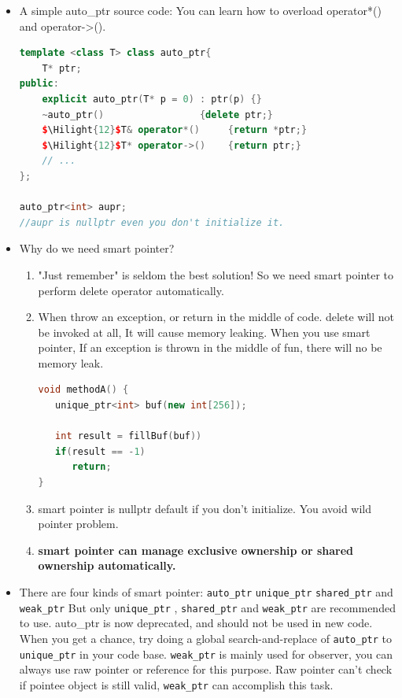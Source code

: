\documentclass[a4paper,12pt,twoside]{book}
\newcommand{\Hilight}[1]{\makebox[0pt][l]{\color{yellow}\rule[-3pt]{#1em}{11pt}}}
\begin{document}
\begin{itemize}
\item A simple auto\_ptr source code: You can learn how to overload operator*() and operator->().
\begin{lstlisting}[frame=single, language=c++, mathescape=true]
template <class T> class auto_ptr{
    T* ptr;
public:
    explicit auto_ptr(T* p = 0) : ptr(p) {}
    ~auto_ptr()                 {delete ptr;}
    $\Hilight{12}$T& operator*()     {return *ptr;}
    $\Hilight{12}$T* operator->()    {return ptr;}
    // ...
};

auto_ptr<int> aupr;
//aupr is nullptr even you don't initialize it.
\end{lstlisting}

\item Why do we need smart pointer?
\begin{enumerate}
\item "Just remember" is seldom the best solution! So we need smart pointer to perform delete operator automatically.

\item When throw an exception, or return in the middle of code. delete will not be invoked at all, It will cause memory leaking. When you use smart pointer, If an exception is thrown in the middle of fun, there will no be memory leak.
\begin{lstlisting}[frame=single, language=c++]
void methodA() {
   unique_ptr<int> buf(new int[256]);

   int result = fillBuf(buf))
   if(result == -1)
      return;
}
\end{lstlisting}

\item smart pointer is nullptr default if you don't initialize. You avoid wild pointer problem.

\item \textbf{smart pointer can manage exclusive ownership or shared ownership automatically. }
\end{enumerate}

\item There are four kinds of smart pointer: \texttt{auto\_ptr} \texttt{unique\_ptr} \texttt{shared\_ptr} and \texttt{weak\_ptr}  But only \texttt{unique\_ptr} , \texttt{shared\_ptr} and \texttt{weak\_ptr} are recommended to use. auto\_ptr is now deprecated, and should not be used in new code. When you get a chance, try doing a global search-and-replace of \texttt{auto\_ptr} to \texttt{unique\_ptr} in your code base. \texttt{weak\_ptr} is mainly used for observer, you can always use raw pointer or reference for this purpose. Raw pointer can't check if pointee object is still valid, \texttt{weak\_ptr} can accomplish this task.


\end{itemize}
\end{document}
